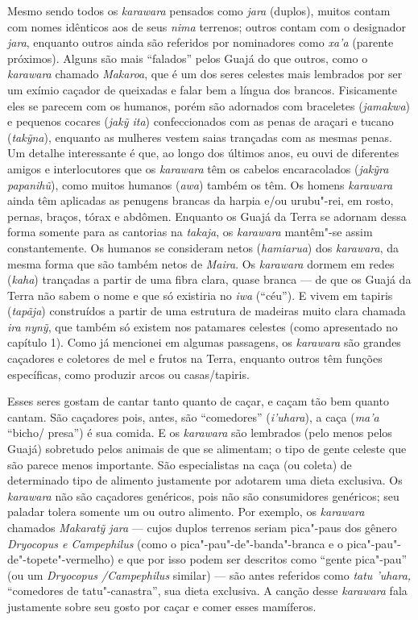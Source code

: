 Mesmo sendo todos os \emph{karawara} pensados como \emph{jara} (duplos),
muitos contam com nomes idênticos aos de seus \emph{nima} terrenos;
outros contam com o designador \emph{jara}, enquanto outros ainda são
referidos por nominadores como \emph{xa'a} (parente próximos). Alguns
são mais ``falados'' pelos Guajá do que outros, como o \emph{karawara}
chamado \emph{Makaroa}, que é um dos seres celestes mais lembrados por ser um
exímio caçador de queixadas e falar bem a língua dos brancos.
Fisicamente eles se parecem com os humanos, porém são adornados com
braceletes (\emph{jamakwa}) e pequenos cocares (\emph{jakỹ ita})
confeccionados com as penas de araçari e tucano (\emph{takỹna}),
enquanto as mulheres vestem saias trançadas com as mesmas penas. Um
detalhe interessante é que, ao longo dos últimos anos, eu ouvi de
diferentes amigos e interlocutores que os \emph{karawara} têm os cabelos
encaracolados (\emph{jakỹra papanihũ}), como muitos humanos
(\emph{awa}) também os têm. Os homens \emph{karawara} ainda têm
aplicadas as penugens brancas da harpia e/ou urubu"-rei, em rosto,
pernas, braços, tórax e abdômen. Enquanto os Guajá da Terra se adornam
dessa forma somente para as cantorias na \emph{takaja}, os
\emph{karawara} mantêm"-se assim constantemente. Os humanos se consideram
netos (\emph{hamiarua}) dos \emph{karawara}, da mesma forma que são
também netos de \emph{Maira}. Os \emph{karawara} dormem em redes
(\emph{kaha}) trançadas a partir de uma fibra clara, quase branca --- de
que os Guajá da Terra não sabem o nome e que só existiria no \emph{iwa}
(``céu''). E vivem em tapiris (\emph{tapãja}) construídos a partir de
uma estrutura de madeiras muito clara chamada \emph{ira} \emph{nynỹ},
que também só existem nos patamares celestes (como apresentado no
capítulo 1). Como já mencionei em algumas passagens, os \emph{karawara}
são grandes caçadores e coletores de mel e frutos na Terra, enquanto
outros têm funções específicas, como produzir arcos ou casas/tapiris.

Esses seres gostam de cantar tanto quanto de caçar, e caçam tão bem
quanto cantam. São caçadores pois, antes, são ``comedores''
(\emph{i'uhara}), a caça (\emph{ma'a} ``bicho/ presa'') é sua comida. E
os \emph{karawara} são lembrados (pelo menos pelos Guajá) sobretudo
pelos animais de que se alimentam; o tipo de gente celeste que são
parece menos importante. São especialistas na caça (ou coleta) de
determinado tipo de alimento justamente por adotarem uma dieta
exclusiva. Os \emph{karawara} não são caçadores genéricos, pois não são
consumidores genéricos; seu paladar tolera somente um ou outro alimento.
Por exemplo, os \emph{karawara} chamados \emph{Makaratỹ jara} --- cujos
duplos terrenos seriam pica"-paus dos gênero \emph{Dryocopus e
Campephilus} (como o pica"-pau"-de"-banda"-branca e o
pica"-pau"-de"-topete"-vermelho) e que por isso podem ser descritos como
``gente pica"-pau'' (ou um \emph{Dryocopus /Campephilus} similar) --- são
antes referidos como \emph{tatu 'uhara,} ``comedores de tatu"-canastra'',
sua dieta exclusiva. A canção desse \emph{karawara} fala justamente
sobre seu gosto por caçar e comer esses mamíferos.

